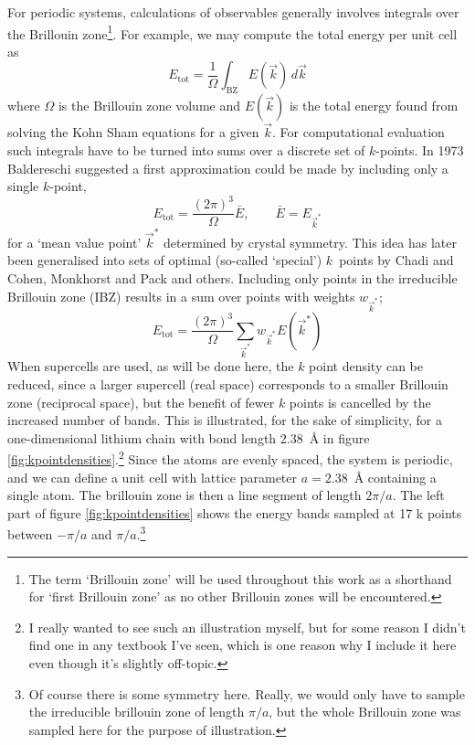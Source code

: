 \documentclass[11pt,bibliography=totoc,index=totoc]{scrbook}   %
\begin{document}
For periodic systems, calculations of observables generally involves integrals over the Brillouin zone\cite[89]{Martin:2004}\footnote{The term `Brillouin zone' will be used throughout this work as
a shorthand for `first Brillouin zone' as no other Brillouin zones will be encountered.}. 
For example, we may compute the total energy per unit cell as\cite[24]{slides:castep06}
\begin{equation}
  E_{\text{tot}} = \frac{1}{\Omega} \int_{\text{BZ}} E(\vec{k}) \,d\vec{k}
\end{equation}
where $\Omega$ is the Brillouin zone volume and $E(\vec{k})$ is the total energy found from solving the Kohn Sham equations for a given $\vec{k}$.
For computational evaluation such integrals have to be turned into sums over a discrete set of $k$-points. 
In 1973 Baldereschi suggested a first approximation could be made by including only a single $k$-point,
\begin{equation}
  E_{\text{tot}} = \frac{(2\pi)^3}{\Omega} \bar{E}, \qquad \bar{E}=E_{\vec{k}^*}
\end{equation}
for a `mean value point' $\vec{k}^*$ determined by crystal symmetry\cite{Baldereschi:1973}. 
This idea has later been generalised into sets of optimal (so-called `special') $k$~points by Chadi and Cohen\cite{Chadi:1973},
Monkhorst and Pack\cite{MonkhorstPack:1976} and others.
Including only points in the irreducible Brillouin zone (IBZ) results in a sum over points with weights $w_{\vec{k}^*}$;
\begin{equation}
  E_{\text{tot}} = \frac{(2\pi)^3}{\Omega}\sum_{\vec{k}^*} w_{\vec{k}^*} E(\vec{k}^*)
\end{equation}
When supercells are used, as will be done here, the $k$ point density can be reduced, since a larger supercell (real space) corresponds to a smaller Brillouin zone (reciprocal space), but the benefit of fewer $k$ points is cancelled by the increased number of bands. 
This is illustrated, for the sake of simplicity, for a one-dimensional 
lithium chain with bond length 2.38~Å in figure \ref{fig:kpointdensities}.\footnote{I really wanted to see such an illustration myself, 
but for some reason I didn't find one in any textbook I've seen, which is one reason why I include it here even though it's slightly off-topic.}
Since the atoms are evenly spaced,
the system is periodic, and we can define a unit cell with lattice parameter 
$a=2.38$~Å containing a single atom. 
The brillouin zone is then a line segment of length $2\pi/a$. 
The left part of figure \ref{fig:kpointdensities} shows the energy bands sampled at 17 k points between $-\pi/a$ and $\pi/a$.\footnote{Of course there is some symmetry here. Really, we would only have to sample the irreducible brillouin zone of length $\pi/a$, but the whole Brillouin zone was sampled here for the purpose of illustration.}
\end{document}
